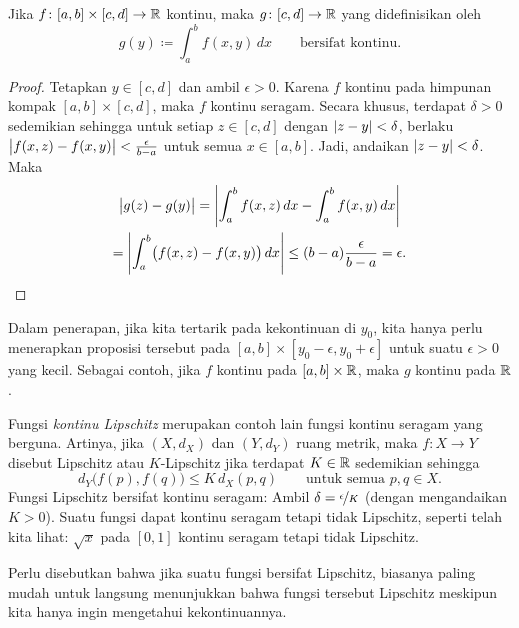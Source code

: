 \begin{prop} \label{prop:integralcontcont}
Jika $f \colon [a,b] \times [c,d] \to {\mathbb{R}}$ kontinu,
maka $g \colon [c,d] \to {\mathbb{R}}$ yang didefinisikan oleh
\begin{equation*}
g(y) \coloneqq \int_a^b f(x,y) \,dx  \qquad \text{bersifat kontinu}.
\end{equation*}
\end{prop}

\begin{proof}
Tetapkan $y \in [c,d]$ dan
ambil $\epsilon > 0$.
Karena $f$ kontinu pada himpunan kompak $[a,b] \times [c,d]$, maka $f$
kontinu seragam.  
Secara khusus, terdapat $\delta > 0$ sedemikian sehingga
untuk setiap $z \in [c,d]$ dengan
$\lvert {z-y} \rvert < \delta$, berlaku
$\bigl\lvert {f(x,z)-f(x,y)} \bigr\rvert < \frac{\epsilon}{b-a}$ untuk semua $x \in [a,b]$.
Jadi, andaikan $\lvert {z-y} \rvert < \delta$.  Maka
\begin{multline*}
\bigl\lvert {
g(z)-
g(y)
} \bigr\rvert
=
\left\lvert {
\int_a^b 
f(x,z) \,dx 
-
\int_a^b 
f(x,y) \,dx 
} \right\rvert
\\
=
\left\lvert {
\int_a^b 
\bigl(
f(x,z) - f(x,y)
\bigr)
\,dx 
} \right\rvert
\leq
(b-a)
\frac{\epsilon}{b-a}
= \epsilon . \qedhere
\end{multline*}
\end{proof}

Dalam penerapan, jika kita tertarik pada kekontinuan di $y_0$, kita hanya
perlu menerapkan proposisi tersebut pada $[a,b] \times [y_0-\epsilon,y_0+\epsilon]$
untuk suatu $\epsilon > 0$ yang kecil.  Sebagai contoh, jika $f$ kontinu pada
$[a,b] \times {\mathbb{R}}$, maka $g$ kontinu pada ${\mathbb{R}}$.

\begin{example}
Fungsi
\emph{kontinu Lipschitz}%
%
merupakan contoh lain fungsi kontinu seragam yang berguna.  Artinya, jika
$(X,d_X)$ dan $(Y,d_Y)$ ruang metrik, maka $f \colon X \to Y$
disebut Lipschitz atau $K$-Lipschitz jika terdapat $K \in {\mathbb{R}}$ sedemikian sehingga
\begin{equation*}
d_Y\bigl(f(p),f(q)\bigr) \leq K \, d_X(p,q)
\qquad \text{untuk semua } p,q \in X.
\end{equation*}
Fungsi Lipschitz bersifat kontinu seragam:
Ambil $\delta = \nicefrac{\epsilon}{K}$ (dengan mengandaikan $K > 0$).
Suatu fungsi dapat kontinu seragam
tetapi tidak Lipschitz,
seperti telah kita lihat: $\sqrt{x}$ pada $[0,1]$
kontinu seragam tetapi tidak Lipschitz.

Perlu disebutkan bahwa
jika suatu fungsi bersifat Lipschitz, biasanya paling mudah
untuk langsung menunjukkan bahwa fungsi tersebut Lipschitz meskipun kita hanya
ingin mengetahui kekontinuannya.
\end{example}


